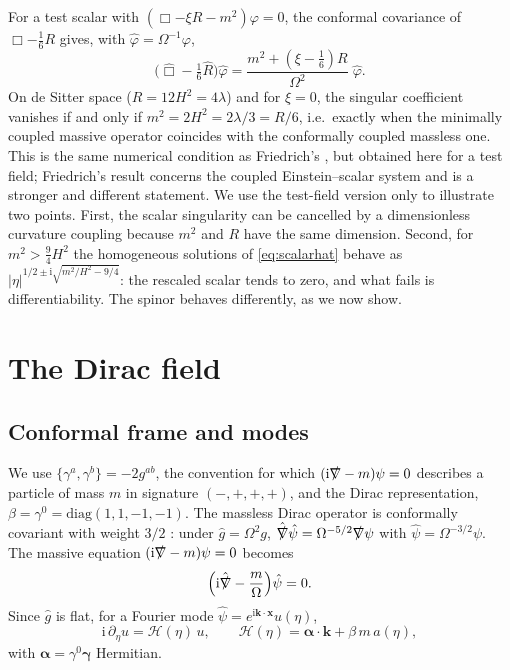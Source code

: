 \documentclass[11pt,a4paper]{article}
\theoremstyle{definition}
\newcommand{\ii}{\mathrm{i}}
\newcommand{\hg}{\hat g}
\newcommand{\hpsi}{\hat\psi}
\newcommand{\hphi}{\hat\varphi}
\begin{document}
For a test scalar with $(\Box-\xi R-m^{2})\varphi=0$, the conformal covariance of $\Box-\tfrac16R$ gives, with $\hphi=\Omega^{-1}\varphi$,
\begin{equation}
\Big(\hat\Box-\tfrac16\hat R\Big)\hphi=\frac{m^{2}+(\xi-\tfrac16)R}{\Omega^{2}}\;\hphi .
\label{eq:scalarhat}
\end{equation}
On de Sitter space ($R=12H^{2}=4\lambda$) and for $\xi=0$, the singular coefficient vanishes if and only if $m^{2}=2H^{2}=2\lambda/3=R/6$, i.e.\ exactly when the minimally coupled massive operator coincides with the conformally coupled massless one. This is the same numerical condition as Friedrich's \cite{Friedrich2015}, but obtained here for a test field; Friedrich's result concerns the coupled Einstein--scalar system and is a stronger and different statement. We use the test-field version only to illustrate two points. First, the scalar singularity can be cancelled by a dimensionless curvature coupling because $m^{2}$ and $R$ have the same dimension. Second, for $m^{2}>\tfrac94H^{2}$ the homogeneous solutions of \eqref{eq:scalarhat} behave as $|\eta|^{1/2\pm\ii\sqrt{m^{2}/H^{2}-9/4}}$: the rescaled scalar tends to zero, and what fails is differentiability. The spinor behaves differently, as we now show.

\section{The Dirac field}
\label{sec:dirac}

\subsection{Conformal frame and modes}
\label{sec:modes}

We use $\{\gamma^{a},\gamma^{b}\}=-2g^{ab}$, the convention for which $(\ii\slashed\nabla-m)\psi=0$ describes a particle of mass $m$ in signature $(-,+,+,+)$, and the Dirac representation, $\beta=\gamma^{0}=\mathrm{diag}(1,1,-1,-1)$. The massless Dirac operator is conformally covariant with weight $3/2$ \cite{BirrellDavies,ParkerToms}: under $\hg=\Omega^{2}g$, $\hat{\slashed\nabla}\hpsi=\Omega^{-5/2}\slashed\nabla\psi$ with $\hpsi=\Omega^{-3/2}\psi$. The massive equation $(\ii\slashed\nabla-m)\psi=0$ becomes
\begin{equation}
\Big(\ii\hat{\slashed\nabla}-\frac{m}{\Omega}\Big)\hpsi=0 .
\label{eq:dirachat}
\end{equation}
Since $\hg$ is flat, for a Fourier mode $\hpsi=e^{\ii\mathbf{k}\cdot\mathbf{x}}u(\eta)$,
\begin{equation}
\ii\,\partial_{\eta}u=\mathcal{H}(\eta)\,u,\qquad \mathcal{H}(\eta)=\boldsymbol\alpha\cdot\mathbf{k}+\beta\,m\,a(\eta),
\label{eq:hk}
\end{equation}
with $\boldsymbol\alpha=\gamma^{0}\boldsymbol\gamma$ Hermitian.
\end{document}
